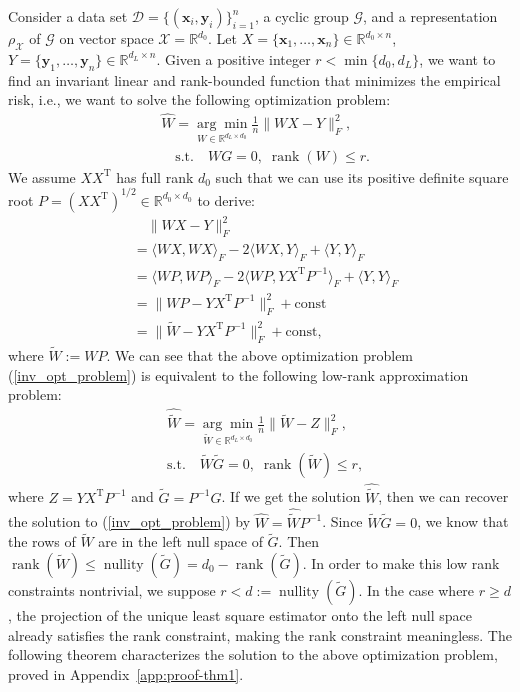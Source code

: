 \documentclass{article}
\newcommand{\T}{\mathrm{T}}
\theoremstyle{plain}
\theoremstyle{definition}
\theoremstyle{remark}
\theoremstyle{remark}
\begin{document}
Consider a data set $\mathcal{D} = \{(\mathbf{x}_i, \mathbf{y}_i)\}_{i=1}^n$, a cyclic group $\mathcal{G}$, and a representation $\rho_{\mathcal{X}}$ of $\mathcal{G}$ on vector space $\mathcal{X} = \mathbb{R}^{d_0}$. Let $X = \{\mathbf{x}_1, \dots ,\mathbf{x}_n\} \in \mathbb{R}^{d_0 \times n}$, $Y = \{\mathbf{y}_1, \dots , \mathbf{y}_n \} \in \mathbb{R}^{d_L \times n}$. 
Given a positive integer $r < \min\{d_0, d_L\}$, we want to find an invariant linear and rank-bounded function that minimizes the empirical risk, i.e., we want to solve the following optimization problem: 
\begin{align} \label{inv_opt_problem}
  & \widehat{W} = \underset{W \in \mathbb{R}^{d_L \times d_0}}{\arg \min} \frac{1}{n}\|WX - Y\|_F^2, \nonumber \\
  & \quad \text{s.t.} \quad W G = 0, \; \operatorname*{rank}(W) \leq r.
\end{align}
We assume $X X^{\T}$ has full rank $d_0$ such that we can use its positive definite square root $P =(XX^\T)^{1/2}\in \mathbb{R}^{d_0 \times d_0}$ to derive:
\begin{align}
  & \quad \|WX - Y\|_F^2 \nonumber \\
  &= \langle WX , WX \rangle_{F} -2 \langle WX, Y \rangle_{F} + \langle Y, Y \rangle_{F}  \nonumber \\
  &= \langle WP, WP \rangle_{F} -2 \langle WP, Y X^{\T} P^{-1}  \rangle_{F} + \langle Y, Y \rangle_{F} \nonumber \\
  &= \|WP - Y X^{\T} P^{-1}\|_F^2 + \text{const}  \nonumber \\
  &= \|\widetilde{W} - Y X^{\T} P^{-1}\|_F^2 + \text{const},
\end{align}
where $\widetilde{W} := WP$.
We can see that the above optimization problem (\ref{inv_opt_problem}) is equivalent to the following low-rank approximation problem: 
\begin{align}
  & \widehat{\widetilde{W}} = \underset{\widetilde{W} \in \mathbb{R}^{d_L \times d_0}}{\arg \min} \frac{1}{n} \|\widetilde{W} - Z\|_F^2, \nonumber \\
  & \text{s.t.} \quad \widetilde{W} \widetilde{G} = 0, \; \operatorname*{rank}(\widetilde{W}) \leq r,
\end{align}
where $Z = Y X^{\T} P^{-1}$ and $\widetilde{G} = P^{-1} G$. 
If we get the solution $\widehat{\widetilde{W}}$, then we can recover the solution to (\ref{inv_opt_problem})
by $\widehat{W} = \widehat{\widetilde{W}} P^{-1}$. Since $\widetilde{W}\widetilde{G} = 0$, we know that the rows of $\widetilde{W}$ are in the left null space of $\widetilde{G}$. 
Then $\operatorname*{rank}(\widetilde{W}) \leq \operatorname*{nullity}(\widetilde{G}) = d_0-\operatorname*{rank}(\widetilde{G})$. 
In order to make this low rank constraints nontrivial, we suppose $r < d :=\operatorname*{nullity}(\widetilde{G})$. 
In the case where $r \geq d$, the projection of the unique least square estimator onto the left null space already satisfies the rank constraint, making the rank constraint meaningless. The following theorem characterizes the solution to the above optimization problem, proved in Appendix~\ref{app:proof-thm1}. 
\end{document}
